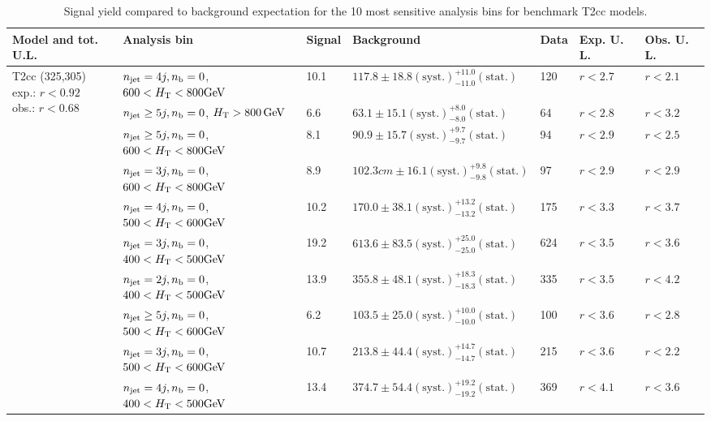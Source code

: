 \begin{table}[h!] 
  \scriptsize
  \caption{ 
Signal yield compared to background expectation for the 10 most sensitive analysis bins 
for benchmark T2cc models.
  \label{tab:sigBenchmarksYields_T2cc}}
  \centering 
  \begin{tabular}{ lllllll } 
    \hline 
    \hline 
    Model and tot. U.L. & Analysis bin & Signal & Background & Data & Exp. U. L. & Obs. U. L. \\ \hline
\multirow{10}{*}{\parbox[t]{2.3cm}{T2cc (325,305)\\exp.: $r<0.92$\\obs.: $r<0.68$}}
 & $n_{\mathrm{jet}} =4j,n_{\text{b}} =0$, $600 < \mbox{$H_\text{T}$} < 800 \mathrm{GeV}$ & 10.1 & $117.8 \pm 18.8 \mathrm{(syst.)} ^{+11.0}_{-11.0} \mathrm{(stat.)}$ & 120 & $r < 2.7$ & $r < 2.1$\\ 
 & $n_{\mathrm{jet}} \geq5j,n_{\text{b}} =0$, $\mbox{$H_\text{T}$} > 800 \, \mathrm{GeV}$ & 6.6 & $63.1 \pm 15.1 \mathrm{(syst.)} ^{+8.0}_{-8.0} \mathrm{(stat.)}$ & 64 & $r < 2.8$ & $r < 3.2$\\ 
 & $n_{\mathrm{jet}} \geq5j,n_{\text{b}} =0$, $600 < \mbox{$H_\text{T}$} < 800 \mathrm{GeV}$ & 8.1 & $90.9 \pm 15.7 \mathrm{(syst.)} ^{+9.7}_{-9.7} \mathrm{(stat.)}$ & 94 & $r < 2.9$ & $r < 2.5$\\ 
 & $n_{\mathrm{jet}} =3j,n_{\text{b}} =0$, $600 < \mbox{$H_\text{T}$} < 800 \mathrm{GeV}$ & 8.9 & $102.3cm \pm 16.1 \mathrm{(syst.)} ^{+9.8}_{-9.8} \mathrm{(stat.)}$ & 97 & $r < 2.9$ & $r < 2.9$\\ 
 & $n_{\mathrm{jet}} =4j,n_{\text{b}} =0$, $500 < \mbox{$H_\text{T}$} < 600 \mathrm{GeV}$ & 10.2 & $170.0 \pm 38.1 \mathrm{(syst.)} ^{+13.2}_{-13.2} \mathrm{(stat.)}$ & 175 & $r < 3.3$ & $r < 3.7$\\ 
 & $n_{\mathrm{jet}} =3j,n_{\text{b}} =0$, $400 < \mbox{$H_\text{T}$} < 500 \mathrm{GeV}$ & 19.2 & $613.6 \pm 83.5 \mathrm{(syst.)} ^{+25.0}_{-25.0} \mathrm{(stat.)}$ & 624 & $r < 3.5$ & $r < 3.6$\\ 
 & $n_{\mathrm{jet}} =2j,n_{\text{b}} =0$, $400 < \mbox{$H_\text{T}$} < 500 \mathrm{GeV}$ & 13.9 & $355.8 \pm 48.1 \mathrm{(syst.)} ^{+18.3}_{-18.3} \mathrm{(stat.)}$ & 335 & $r < 3.5$ & $r < 4.2$\\ 
 & $n_{\mathrm{jet}} \geq5j,n_{\text{b}} =0$, $500 < \mbox{$H_\text{T}$} < 600 \mathrm{GeV}$ & 6.2 & $103.5 \pm 25.0 \mathrm{(syst.)} ^{+10.0}_{-10.0} \mathrm{(stat.)}$ & 100 & $r < 3.6$ & $r < 2.8$\\ 
 & $n_{\mathrm{jet}} =3j,n_{\text{b}} =0$, $500 < \mbox{$H_\text{T}$} < 600 \mathrm{GeV}$ & 10.7 & $213.8 \pm 44.4 \mathrm{(syst.)} ^{+14.7}_{-14.7} \mathrm{(stat.)}$ & 215 & $r < 3.6$ & $r < 2.2$\\ 
 & $n_{\mathrm{jet}} =4j,n_{\text{b}} =0$, $400 < \mbox{$H_\text{T}$} < 500 \mathrm{GeV}$ & 13.4 & $374.7 \pm 54.4 \mathrm{(syst.)} ^{+19.2}_{-19.2} \mathrm{(stat.)}$ & 369 & $r < 4.1$ & $r < 3.6$\\ \hline
    \hline
  \end{tabular}
\end{table}

